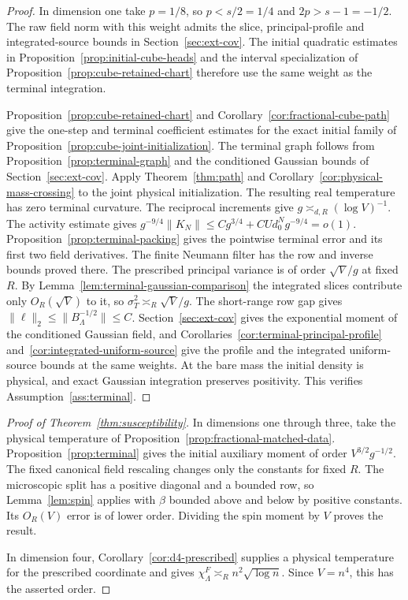 \documentclass[11pt]{article}
\theoremstyle{definition}
\begin{document}
\begin{proof}
In dimension one take \(p=1/8\), so \(p<s/2=1/4\) and
\(2p>s-1=-1/2\). The raw field norm with this weight admits the
slice, principal-profile and integrated-source bounds in
Section~\ref{sec:ext-cov}. The initial quadratic estimates in
Proposition~\ref{prop:initial-cube-heads} and the interval
specialization of Proposition~\ref{prop:cube-retained-chart} therefore
use the same weight as the terminal integration.

Proposition~\ref{prop:cube-retained-chart}
and Corollary~\ref{cor:fractional-cube-path} give the one-step and
terminal coefficient estimates for the exact initial family of
Proposition~\ref{prop:cube-joint-initialization}.
The terminal graph follows from Proposition~\ref{prop:terminal-graph}
and the conditioned Gaussian bounds of Section~\ref{sec:ext-cov}.
Apply Theorem~\ref{thm:path} and Corollary~\ref{cor:physical-mass-crossing}
to the joint physical initialization.
The resulting real temperature has zero terminal curvature.
The reciprocal increments give \(g\asymp_{d,R}(\log V)^{-1}\).
The activity estimate gives
\(g^{-9/4}\|K_N\|\le C g^{3/4}+C U d_0^N g^{-9/4}=o(1)\).
Proposition~\ref{prop:terminal-packing} gives the pointwise
terminal error and its first two field derivatives. The finite
Neumann filter has the row and inverse bounds proved there.
The prescribed principal variance is of order \(\sqrt V/g\) at
fixed \(R\). By Lemma~\ref{lem:terminal-gaussian-comparison}
the integrated slices contribute only \(O_R(\sqrt V)\) to it,
so \(\sigma_T^2\asymp_R\sqrt V/g\). The short-range row gap gives
\(\|\ell\|_2\le\|B_\Lambda^{-1/2}\|\le C\).
Section~\ref{sec:ext-cov} gives the exponential moment of the
conditioned Gaussian field, and Corollaries~\ref{cor:terminal-principal-profile}
and~\ref{cor:integrated-uniform-source} give the profile and the
integrated uniform-source bounds at the same weights. At the bare
mass the initial density is physical, and exact Gaussian integration
preserves positivity. This verifies Assumption~\ref{ass:terminal}.
\end{proof}

\begin{proof}[Proof of Theorem~\ref{thm:susceptibility}]
In dimensions one through three, take the physical temperature of
Proposition~\ref{prop:fractional-matched-data}. Proposition~\ref{prop:terminal}
gives the initial auxiliary moment of order \(V^{3/2}g^{-1/2}\). The fixed canonical
field rescaling changes only the constants for fixed \(R\).
The microscopic split has a positive diagonal and a bounded row,
so Lemma~\ref{lem:spin} applies with \(\beta\) bounded above and
below by positive constants. Its \(O_R(V)\) error is of lower
order. Dividing the spin moment by \(V\) proves the result.

In dimension four, Corollary~\ref{cor:d4-prescribed} supplies a
physical temperature for the prescribed coordinate and gives
\(\chi_\Lambda^F\asymp_R n^2\sqrt{\log n}\). Since \(V=n^4\), this
has the asserted order.
\end{proof}
\end{document}
